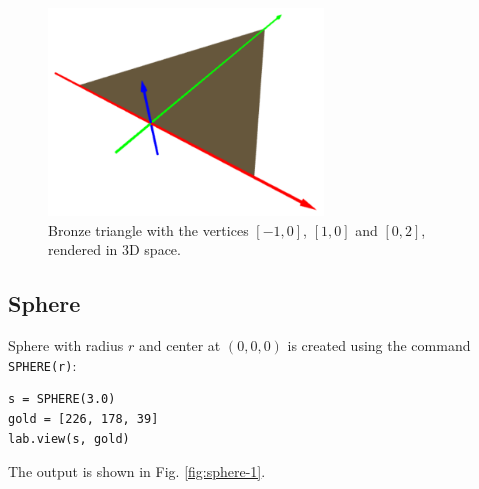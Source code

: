 \begin{figure}[!ht]
\begin{center}
\includegraphics[width=0.65\textwidth]{img/tria-112.png}
\end{center}
\vspace{-4mm}
\caption{Bronze triangle with the vertices $[-1, 0]$, $[1, 0]$ and $[0, 2]$, rendered in 3D space.}
\label{fig:tria-112}
\end{figure}
\noindent

\subsection{Sphere}

Sphere with radius $r$ and center at $(0, 0, 0)$ is created using the command 
{\tt SPHERE(r)}:\\

\begin{bbox}
\begin{verbatim}
s = SPHERE(3.0)
gold = [226, 178, 39]
lab.view(s, gold)
\end{verbatim}
\end{bbox}
\vspace{6mm}

\noindent
The output is shown in Fig. \ref{fig:sphere-1}.

